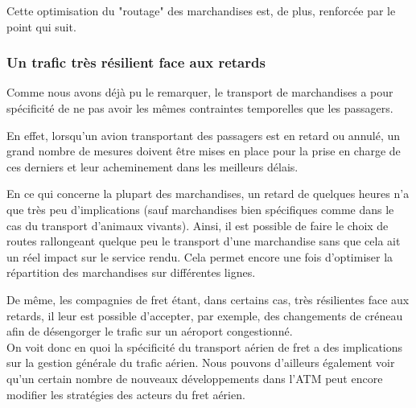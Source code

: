 Cette optimisation du "routage" des marchandises est, de plus, renforcée par le point qui suit.

\subsubsection{Un trafic très résilient face aux retards}

Comme nous avons déjà pu le remarquer, le transport de marchandises a pour spécificité de ne pas avoir les mêmes contraintes temporelles que les passagers.

En effet, lorsqu'un avion transportant des passagers est en retard ou annulé, un grand nombre de mesures doivent être mises en place pour la prise en charge de ces derniers et leur acheminement dans les meilleurs délais.

En ce qui concerne la plupart des marchandises, un retard de quelques heures n'a que très peu d'implications (sauf marchandises bien spécifiques comme dans le cas du transport d'animaux vivants). Ainsi, il est possible de faire le choix de routes rallongeant quelque peu le transport d'une marchandise sans que cela ait un réel impact sur le service rendu. Cela permet encore une fois d'optimiser la répartition des marchandises sur différentes lignes.

De même, les compagnies de fret étant, dans certains cas, très résilientes face aux retards, il leur est possible d'accepter, par exemple, des changements de créneau afin de désengorger le trafic sur un aéroport congestionné.\\

On voit donc en quoi la spécificité du transport aérien de fret a des implications sur la gestion générale du trafic aérien. Nous pouvons d'ailleurs également voir qu'un certain nombre de nouveaux développements dans l'ATM peut encore modifier les stratégies des acteurs du fret aérien.
